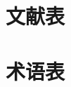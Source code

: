 \documentclass[11pt,a4paper,UTF8]{book}
\begin{document}
\begin{sloppypar}
	\section*{ 文献表}
	
	\newpage
	
	\section*{ 术语表}
	

\end{sloppypar}
\end{document}
